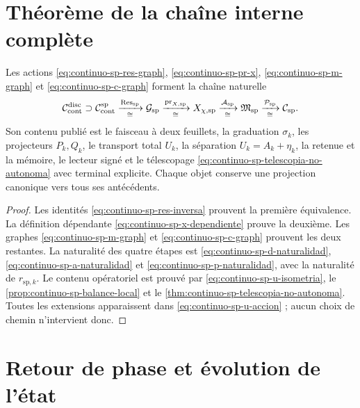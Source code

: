\section{Théorème de la chaîne interne complète}

\begin{theorem}
\label{thm:continuo-sp-cadena-interna}
Les actions
\eqref{eq:continuo-sp-res-graph},
\eqref{eq:continuo-sp-pr-x},
\eqref{eq:continuo-sp-m-graph} et
\eqref{eq:continuo-sp-c-graph} forment la chaîne naturelle
\begin{equation}
\label{eq:continuo-sp-cadena-interna}
 \mathcal C_{\rm cont}^{\rm disc}
 \supset\mathcal C_{\rm cont}^{\mathrm{sp}}
 \xrightarrow[\cong]{\operatorname{Res}_{\mathrm{sp}}}
 \mathcal G_{\mathrm{sp}}
 \xrightarrow[\cong]{\operatorname{pr}_{X,\mathrm{sp}}}
 X_{\chi,\mathrm{sp}}
 \xrightarrow[\cong]{\mathcal A_{\mathrm{sp}}}
 \mathfrak M_{\mathrm{sp}}
 \xrightarrow[\cong]{\mathcal P_{\mathrm{sp}}}
 \mathcal C_{\mathrm{sp}}.
\end{equation}
Son contenu publié est le faisceau à deux feuillets, la graduation
\(\sigma_k\), les projecteurs \(P_k,Q_k\), le transport total \(U_k\),
la séparation \(U_k=A_k+\eta_k\), la retenue et la mémoire, le lecteur signé
et le télescopage
\eqref{eq:continuo-sp-telescopia-no-autonoma} avec terminal explicite. Chaque
objet conserve une projection canonique vers tous ses antécédents.
\end{theorem}

\begin{proof}
Les identités
\eqref{eq:continuo-sp-res-inversa} prouvent la première équivalence. La
définition dépendante \eqref{eq:continuo-sp-x-dependiente} prouve la
deuxième. Les graphes
\eqref{eq:continuo-sp-m-graph} et
\eqref{eq:continuo-sp-c-graph} prouvent les deux restantes. La naturalité des
quatre étapes est
\eqref{eq:continuo-sp-d-naturalidad},
\eqref{eq:continuo-sp-a-naturalidad} et
\eqref{eq:continuo-sp-p-naturalidad}, avec la naturalité de
\(r_{\mathrm{sp},k}\). Le contenu opératoriel est prouvé par
\eqref{eq:continuo-sp-u-isometria}, le
\cref{prop:continuo-sp-balance-local} et le
\cref{thm:continuo-sp-telescopia-no-autonoma}. Toutes les extensions apparaissent
dans \eqref{eq:continuo-sp-u-accion} ; aucun choix de
chemin n'intervient donc.
\end{proof}

\section{Retour de phase et évolution de l'état}

